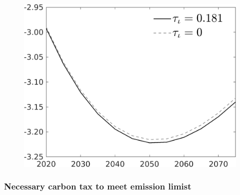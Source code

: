 \begin{figure}[h!!]
\begin{minipage}[]{0.32\textwidth}
	\end{minipage}
	\begin{minipage}[]{0.32\textwidth}
		\includegraphics[width=1\textwidth]{../../codding_model/own_basedOnFried/optimalPol_010922_revision/figures/all_13Sept22/PerdifNoTauf_Equlab_regime0_CompTaul_EY_spillover0_nsk0_xgr0_knspil1_sep0_LFlimit0_emsbase0_countec0_GovRev0_etaa0.79_lgd1.png}
	\end{minipage}
\end{figure} 

\subsubsection{Necessary carbon tax to meet emission limist}

